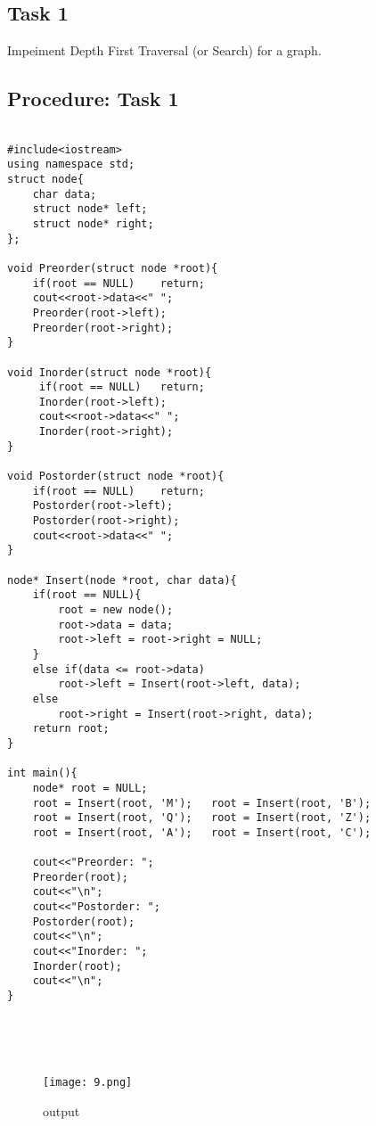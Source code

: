 \documentclass[11pt]{article}            %
\begin{document}
\subsection{ Task 1 }     

Impeiment Depth First Traversal (or Search) for a graph.

\subsection{Procedure: Task 1 }    
 

\begin{lstlisting}

#include<iostream>
using namespace std;
struct node{
	char data;
	struct node* left;
	struct node* right;
};

void Preorder(struct node *root){
	if(root == NULL)	return;
	cout<<root->data<<" ";
	Preorder(root->left);
	Preorder(root->right);
}

void Inorder(struct node *root){
	 if(root == NULL)	return;
	 Inorder(root->left);
	 cout<<root->data<<" ";
	 Inorder(root->right);
}

void Postorder(struct node *root){
	if(root == NULL)	return;
	Postorder(root->left);
	Postorder(root->right);
	cout<<root->data<<" ";
}

node* Insert(node *root, char data){
	if(root == NULL){
		root = new node();
		root->data = data;
		root->left = root->right = NULL;
	}
	else if(data <= root->data)
		root->left = Insert(root->left, data);
	else
		root->right = Insert(root->right, data);
	return root;
}

int main(){
	node* root = NULL;
	root = Insert(root, 'M');	root = Insert(root, 'B');
	root = Insert(root, 'Q');	root = Insert(root, 'Z');
	root = Insert(root, 'A');	root = Insert(root, 'C');
	
	cout<<"Preorder: ";
	Preorder(root);
	cout<<"\n";
	cout<<"Postorder: ";
	Postorder(root);
	cout<<"\n";
	cout<<"Inorder: ";
	Inorder(root);
	cout<<"\n";
}





\end{lstlisting}
\begin{figure*}
\centering
  \texttt{[image: 9.png]}
\caption{output}
\label{Figure:3}    
\end{figure*} 




 
\end{document}

